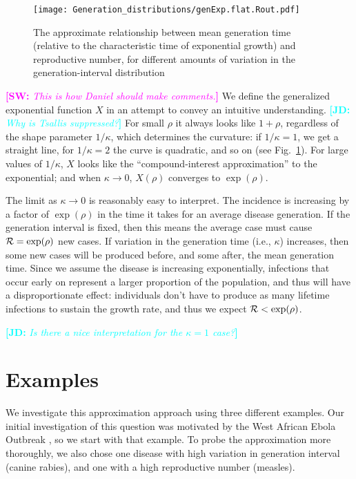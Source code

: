 \documentclass[12pt,]{article}
\newcommand{\RR}{\ensuremath{{\cal R}}}
\newcommand{\fref}[1]{Fig.~\ref{fig:#1}}
\newcommand{\comment}[3]{\textcolor{#1}{\textbf{[#2: }\textit{#3}\textbf{]}}}
\newcommand{\jd}[1]{\comment{cyan}{JD}{#1}}
\newcommand{\sw}[1]{\comment{magenta}{SW}{#1}}
\begin{document}
\begin{figure}[htbp]
	\centering \texttt{[image: Generation\_distributions/genExp.flat.Rout.pdf]}
	\caption{
		The approximate relationship between mean generation time (relative to
		the characteristic time of exponential growth) and reproductive number,
		for different amounts of variation in the generation-interval
		distribution
	} \label{fig:genExp} 
\end{figure}
\sw{This is how Daniel should make comments.}
We define the generalized exponential function $X$ in an attempt to convey an intuitive understanding.
\jd{Why is Tsallis suppressed?}
For small $\rho$ it always looks like $1+\rho$, regardless of the shape parameter $1/\kappa$, which determines the curvature: if $1/\kappa = 1$, we get a straight line, for $1/\kappa=2$ the curve is quadratic, and so on (see \fref{genExp}).
For large values of $1/\kappa$, $X$ looks like the ``compound-interest approximation'' to the exponential; and when $\kappa \to 0$, $X(\rho)$ converges to $\exp(\rho)$.

The limit as $\kappa\to 0$ is reasonably easy to interpret. The incidence is increasing by a factor of $\exp(\rho)$ in the time it takes for an average disease generation. If the generation interval is fixed, then this means the average case must cause $\RR = \exp(\rho)$ new cases.
If variation in the generation time (i.e., $\kappa$) increases, then some new cases will be produced before, and some after, the mean generation time.
Since we assume the disease is increasing exponentially, infections that occur early on represent a larger proportion of the population, and thus will have a disproportionate effect: individuals don't have to produce as many lifetime infections to sustain the growth rate, and thus we expect  $\RR < \exp(\rho)$.

\jd{Is there a nice interpretation for the $\kappa=1$ case?}

\section{Examples}

We investigate this approximation approach using three different examples. Our initial investigation of this question was motivated by the West African Ebola Outbreak \cite{Weitz}, so we start with that example. To probe the approximation more thoroughly, we also chose one disease with high variation in generation interval (canine rabies), and one with a high reproductive number (measles).
\end{document}
